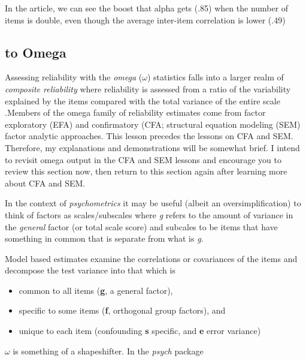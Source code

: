 \documentclass[
  english,
]{book}
\providecommand{\tightlist}{%
  \setlength{\itemsep}{0pt}\setlength{\parskip}{0pt}}
\begin{document}
In the article, we can see the boost that alpha gets (.85) when the number of items is double, even though the average inter-item correlation is lower (.49)

\hypertarget{to-omega}{%
\subsection{to Omega}\label{to-omega}}

Assessing reliability with the \emph{omega} (\(\omega\)) statistics falls into a larger realm of \emph{composite reliability} where reliability is assessed from a ratio of the variability explained by the items compared with the total variance of the entire scale \citep{mcneish_thanks_2018}.Members of the omega family of reliability estimates come from factor exploratory (EFA) and confirmatory (CFA; structural equation modeling (SEM) factor analytic approaches. This lesson precedes the lessons on CFA and SEM. Therefore, my explanations and demonstrations will be somewhat brief. I intend to revisit omega output in the CFA and SEM lessons and encourage you to review this section now, then return to this section again after learning more about CFA and SEM.

In the context of \emph{psychometrics} it may be useful (albeit an oversimplification) to think of factors as scales/subscales where \emph{g} refers to the amount of variance in the \emph{general} factor (or total scale score) and subcales to be items that have something in common that is separate from what is \emph{g}.

Model based estimates examine the correlations or covariances of the items and decompose the test variance into that which is

\begin{itemize}
\tightlist
\item
  common to all items (\textbf{g}, a general factor),
\item
  specific to some items (\textbf{f}, orthogonal group factors), and
\item
  unique to each item (confounding \textbf{s} specific, and \textbf{e} error variance)
\end{itemize}

\(\omega\) is something of a shapeshifter. In the \emph{psych} package
\end{document}
